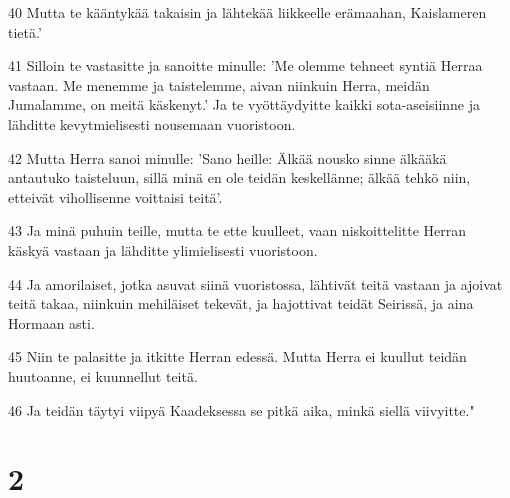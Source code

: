 \par 40 Mutta te kääntykää takaisin ja lähtekää liikkeelle erämaahan, Kaislameren tietä.'
\par 41 Silloin te vastasitte ja sanoitte minulle: 'Me olemme tehneet syntiä Herraa vastaan. Me menemme ja taistelemme, aivan niinkuin Herra, meidän Jumalamme, on meitä käskenyt.' Ja te vyöttäydyitte kaikki sota-aseisiinne ja lähditte kevytmielisesti nousemaan vuoristoon.
\par 42 Mutta Herra sanoi minulle: 'Sano heille: Älkää nousko sinne älkääkä antautuko taisteluun, sillä minä en ole teidän keskellänne; älkää tehkö niin, etteivät vihollisenne voittaisi teitä'.
\par 43 Ja minä puhuin teille, mutta te ette kuulleet, vaan niskoittelitte Herran käskyä vastaan ja lähditte ylimielisesti vuoristoon.
\par 44 Ja amorilaiset, jotka asuvat siinä vuoristossa, lähtivät teitä vastaan ja ajoivat teitä takaa, niinkuin mehiläiset tekevät, ja hajottivat teidät Seirissä, ja aina Hormaan asti.
\par 45 Niin te palasitte ja itkitte Herran edessä. Mutta Herra ei kuullut teidän huutoanne, ei kuunnellut teitä.
\par 46 Ja teidän täytyi viipyä Kaadeksessa se pitkä aika, minkä siellä viivyitte."

\chapter{2}

